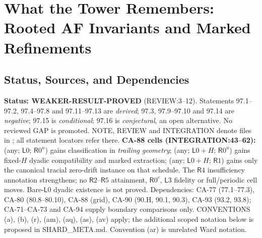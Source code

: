 \section{What the Tower Remembers: Rooted AF Invariants and Marked Refinements}\label{sec:what-the-tower-remembers}

\subsection{Status, Sources, and Dependencies}

\textbf{Status: WEAKER-RESULT-PROVED} (REVIEW:3--12). Statements 97.1--97.2, 97.4--97.8 and 97.11--97.13 are
\emph{derived}; 97.3, 97.9--97.10 and 97.14 are \emph{negative}; 97.15 is \emph{conditional}; 97.16 is
\emph{conjectural}, an open alternative. No reviewed GAP is promoted. NOTE, REVIEW and INTEGRATION denote files in
; all statement locators refer there.
\textbf{CA-88 cells (INTEGRATION:43--62):} (any; \(\mathsf L0\); \(\mathsf R0^u\)) gains classification in
\emph{trailing geometry}; (any; \(\mathsf L0+H\); \(\mathsf R0^u\)) gains fixed-\(H\) dyadic compatibility and marked
extraction; (any; \(\mathsf L0+H\); \(\mathsf R1\)) gains only the canonical tracial zero-drift instance on that schedule.
The \(\mathsf R4\) insufficiency annotation strengthens; no \(\mathsf R2\)--\(\mathsf R5\) attainment, \(\mathsf R0^c\),
\(\mathsf L3\) fidelity or full/periodic cell moves. Bare-\(\mathsf L0\) dyadic existence is not proved.
Dependencies: CA-77 (77.1--77.3), CA-80 (80.8--80.10), CA-88 (grid), CA-90 (90.H, 90.1, 90.3), CA-93 (93.2, 93.8);
CA-71--CA-73 and CA-94 supply boundary comparisons only. CONVENTIONS (a), (b), (r), (am), (aq), (as), (av) apply;
the additional scoped notation below is proposed in SHARD\_META.md. Convention (ar) is unrelated Ward notation.

